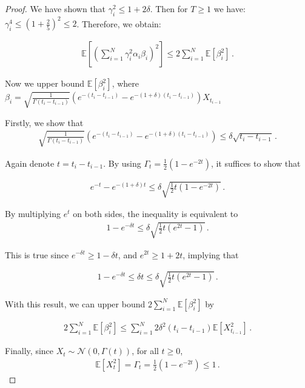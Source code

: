 \documentclass{article}
\theoremstyle{definition}
\begin{document}
\begin{proof}
We have shown that $\gamma_{i}^{2}\leq 1+2\delta$. Then for $T\geq 1$ we have: $\gamma^{4}_{i}\leq (1+\frac{2}{5})^{2}\leq 2$. Therefore, we obtain:

\begin{align*}
\mathbb{E}\left[\left(\sum_{i=1}^{N} \gamma_{i}^{2}\alpha_{i}\beta_{i}\right)^{2}\right]\leq 2\sum_{i=1}^{N}\mathbb{E}\left[\beta^{2}_{i}\right]\,.
\end{align*}

Now we upper bound $\mathbb{E}\left[\beta_{i}^{2}\right]$, where $\beta_{i}=\sqrt{\frac{1}{\Gamma(t_{i}-t_{i-1})}}(e^{-(t_{i}-t_{i-1})}-e^{-(1+\delta)(t_{i}-t_{i-1})})X_{t_{i-1}}$

Firstly, we show that
\begin{align}
 \sqrt{\frac{1}{\Gamma(t_{i}-t_{i-1})}}(e^{-(t_{i}-t_{i-1})}-e^{-(1+\delta)(t_{i}-t_{i-1})})\leq \delta\sqrt{t_{i}-t_{i-1}}\,.
\end{align}


Again denote $t=t_{i}-t_{i-1}$. By using $\Gamma_{t}=\frac{1}{2}(1-e^{-2t})$, it suffices to show that

\begin{align*}
e^{-t}-e^{-(1+\delta)t}\leq \delta \sqrt{\frac{1}{2}t(1-e^{-2t})}\,.
\end{align*}

By multiplying $e^{t}$ on both sides, the inequality is equivalent to 
\begin{align*}
1-e^{-\delta t}\leq \delta \sqrt{\frac{1}{2}t(e^{2t}-1)}\,.
\end{align*}

This is true since $e^{-\delta t}\geq 1-\delta t$, and $e^{2t}\geq 1+2t$, implying that 

\begin{align*}
1-e^{-\delta t}\leq\delta t\leq \delta \sqrt{\frac{1}{2}t(e^{2t}-1)}\,.
\end{align*}

With this result, we can upper bound $2\sum_{i=1}^{N}\mathbb{E}\left[\beta^{2}_{i}\right]$ by

\begin{align*}
2\sum_{i=1}^{N}\mathbb{E}\left[\beta^{2}_{i}\right]\leq \sum_{i=1}^{N}2\delta^{2}(t_{i}-t_{i-1})\mathbb{E}\left[X^{2}_{t_{i-1}}\right]\,.
\end{align*}

Finally, since $X_{t}\sim\mathcal{N}(0,\Gamma(t))$, for all $t\geq 0$,
\begin{align*}
\mathbb{E}\left[X^{2}_{t}\right]=\Gamma_{t}=\frac{1}{2}(1-e^{-2t})\leq 1\,.
\end{align*}


\end{proof}
\end{document}
